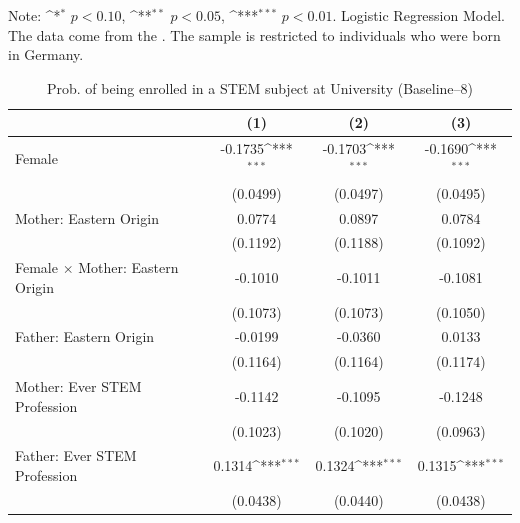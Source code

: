\documentclass[a4paper, oneside, hyperfootnotes = false]{article}
\def\sym#1{\ifmmode^{#1}\else\(^{#1}\)\fi}
\begin{document}
{\begin{table}[ht]
\begin{center}
		\vspace{2mm}
		
		\parbox{10cm}{
			\linespread{1}\footnotesize Note: \sym{*} \(p<0.10\), \sym{**} \(p<0.05\), \sym{***} \(p<0.01\). Logistic Regression Model. The data come from the \cite{SOEP2023}. The sample is restricted to individuals who were born in Germany.}
		
	\end{center}
\end{table}

\begin{table}[ht]
	\caption[STEM subject at University (Baseline--8)]{Prob. of being enrolled in a STEM subject at University (Baseline--8)}
	\label{tab:baseline--8}
	\begin{center}
		\begin{tabular}{l*{3}{c}}
			\toprule
			&\multicolumn{1}{c}{(1)}         &\multicolumn{1}{c}{(2)}         &\multicolumn{1}{c}{(3)}         \\
			\midrule
			Female              &     -0.1735\sym{***}&     -0.1703\sym{***}&     -0.1690\sym{***}\\
			&    (0.0499)         &    (0.0497)         &    (0.0495)         \\
			\addlinespace
			Mother: Eastern Origin&      0.0774         &      0.0897         &      0.0784         \\
			&    (0.1192)         &    (0.1188)         &    (0.1092)         \\
			\addlinespace
			Female $\times$ Mother: Eastern Origin&     -0.1010         &     -0.1011         &     -0.1081         \\
			&    (0.1073)         &    (0.1073)         &    (0.1050)         \\
			\addlinespace
			Father: Eastern Origin&     -0.0199         &     -0.0360         &      0.0133         \\
			&    (0.1164)         &    (0.1164)         &    (0.1174)         \\
			\addlinespace
			Mother: Ever STEM Profession&     -0.1142         &     -0.1095         &     -0.1248         \\
			&    (0.1023)         &    (0.1020)         &    (0.0963)         \\
			\addlinespace
			Father: Ever STEM Profession&      0.1314\sym{***}&      0.1324\sym{***}&      0.1315\sym{***}\\
			&    (0.0438)         &    (0.0440)         &    (0.0438)         \\

\end{tabular}
\end{center}
\end{table}}
\end{document}
